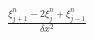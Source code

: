 \documentclass[preview]{standalone}
\begin{document}
\begin{align*}
\frac{\xi_{j+1}^{n} - 2 \xi_{j}^{n} + \xi_{j-1}^{n}}{\delta x^2}
\end{align*}
\end{document}
